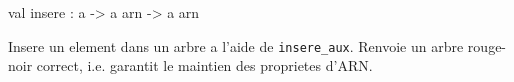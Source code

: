 \documentclass[11pt]{article}
\begin{document}
\label{val:Arn-underscoredoc.insere}\begin{ocamldoccode}
val insere : {\textquotesingle}a -> {\textquotesingle}a arn -> {\textquotesingle}a arn
\end{ocamldoccode}
\begin{ocamldocdescription}
Insere un element dans un arbre 
    a l'aide de {\tt{insere\_aux}}.
    Renvoie un arbre rouge-noir correct,
    i.e. garantit le maintien des proprietes d'ARN.


\end{ocamldocdescription}
\end{document}
